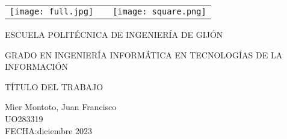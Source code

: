 \begin{titlepage}
    \centering
    \bfseries {
        \null{}
        \vspace{0cm}
        \begin{table}[h]
            \centering
            \begin{tabular}{m{10cm} m{1cm} m{3cm}}
                \vspace{0.2cm}
                \texttt{[image: full.jpg]} &  & \vspace{1.52mm} \texttt{[image: square.png]} \\
            \end{tabular}
        \end{table}

        \vspace{3\baselineskip}

        \Large {
            ESCUELA POLITÉCNICA DE INGENIERÍA DE GIJÓN \\ \vspace{3\baselineskip}
        }
        \large {
            GRADO EN INGENIERÍA INFORMÁTICA EN TECNOLOGÍAS DE LA INFORMACIÓN \\ \vspace{3\baselineskip}

            TÍTULO DEL TRABAJO \\ \vspace{3\baselineskip}

            Mier Montoto, Juan Francisco \\
            UO283319 \\

            \vspace{2\baselineskip}
            FECHA:\@ diciembre 2023
        }
    }
\end{titlepage}
